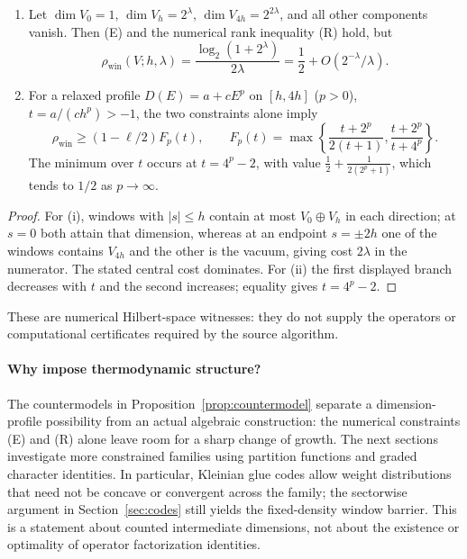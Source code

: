 \documentclass[10pt,a4paper]{article}
\numberwithin{equation}{section}
\theoremstyle{remark}\newtheorem{remark}[theorem]{Remark}\newtheorem{question}[theorem]{Question}
\newcommand{\rhow}{\rho_{\mathrm{win}}}\newcommand{\F}{\mathbb F}\newcommand{\K}{\mathbb K}\newcommand{\Z}{\mathbb Z}\newcommand{\R}{\mathbb R}\newcommand{\cB}{\mathcal L}\newcommand{\wt}{\mathrm{wt}}\newcommand{\dimn}{\operatorname{dim}}\newcommand{\supp}{\operatorname{supp}}
\begin{document}
\begin{proposition}\label{prop:countermodel}
\begin{enumerate}[label=\textup{(\roman*)}]
\item Let $\dimn V_0=1$, $\dimn V_h=2^\lambda$, $\dimn V_{4h}=2^{2\lambda}$, and all other components vanish. Then (E) and the numerical rank inequality (R) hold, but
\[\rhow(V;h,\lambda)=\frac{\log_2(1+2^\lambda)}{2\lambda}=\frac12+O(2^{-\lambda}/\lambda).\]
\item For a relaxed profile $D(E)=a+cE^p$ on $[h,4h]$ ($p>0$), $t=a/(ch^p)>-1$, the two constraints alone imply
\[
\rhow\ge(1-\ell/2)F_p(t),\qquad
F_p(t)=\max\left\{\frac{t+2^p}{2(t+1)},\frac{t+2^p}{t+4^p}\right\}.
\]
The minimum over $t$ occurs at $t=4^p-2$, with value $\frac12+\frac{1}{2(2^p+1)}$, which tends to $1/2$ as $p\to\infty$.
\end{enumerate}
\end{proposition}
\begin{proof}For (i), windows with $|s|\le h$ contain at most $V_0\oplus V_h$ in each direction; at $s=0$ both attain that dimension, whereas at an endpoint $s=\pm2h$ one of the windows contains $V_{4h}$ and the other is the vacuum, giving cost $2\lambda$ in the numerator. The stated central cost dominates. For (ii) the first displayed branch decreases with $t$ and the second increases; equality gives $t=4^p-2$.\end{proof}
These are numerical Hilbert-space witnesses: they do not supply the operators or computational certificates required by the source algorithm.

\paragraph{Why impose thermodynamic structure?}
The countermodels in Proposition~\ref{prop:countermodel} separate a dimension-profile possibility from an actual algebraic construction: the numerical constraints (E) and (R) alone leave room for a sharp change of growth. The next sections investigate more constrained families using partition functions and graded character identities. In particular, Kleinian glue codes allow weight distributions that need not be concave or convergent across the family; the sectorwise argument in Section~\ref{sec:codes} still yields the fixed-density window barrier. This is a statement about counted intermediate dimensions, not about the existence or optimality of operator factorization identities.
\end{document}
